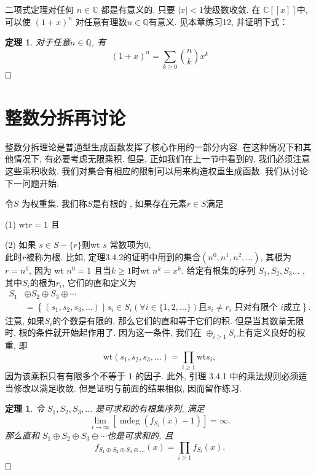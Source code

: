 \documentclass[a4paper,12pt]{ctexbook}
\newtheorem{theorem}[lemma]{\hspace{2em}定理}%
\begin{document}
二项式定理对任何  $n \in \mathbb{C}$ 都是有意义的, 只要 $|x|<1$使级数收敛. 在 $\mathbb{C}[[x]]$中, 可以使 $(1+x)^{n}$ 对任意有理数$n \in \mathbb{Q}$有意义. 见本章练习12, 并证明下式：
\begin{theorem}
	对于任意$n \in \mathbb{Q}$, 有$$
	(1+x)^{n}=\sum_{k \geq 0}\binom{n}{k}x^{k}
	$$
	$\hfill\square$
\end{theorem}
\section{整数分拆再讨论}
整数分拆理论是普通型生成函数发挥了核心作用的一部分内容. 在这种情况下和其他情况下, 有必要考虑无限乘积. 但是, 正如我们在上一节中看到的, 我们必须注意这些乘积收敛. 我们对集合有相应的限制可以用来构造权重生成函数. 我们从讨论下一问题开始.

令$S$ 为权重集. 我们称$S$是{\kaishu 有根的} , 如果存在元素$r \in S$满足

(1) $\mathrm{wt} r=1$ 且

(2) 如果 $s \in S-\{r\}$则wt $s$ 常数项为0, \\
此时$r$被称为{\kaishu 根}. 比如, 定理3.4.2的证明中用到的集合$\left(n^{0}, n^{1}, n^{2}, \ldots\right)$, 其根为$r=n^{0}$, 因为 wt $n^{0}=1$ 且当$k \geq 1$时wt $n^{k}=x^{k}$. 给定有根集的序列 $S_{1}, S_{2}, S_{3} \ldots$ , 其中$S_{i}$的根为$r_{i}$, 它们的{\kaishu 直和}定义为
$$
\begin{aligned}
S_{1} & \oplus S_{2} \oplus S_{3} \oplus \cdots \\
&=\left\{\left(s_{1}, s_{2}, s_{3}, \ldots\right) \mid s_{i} \in S_{i} (\forall i\in\{1,2,\dots\})\text {且} s_{i} \neq r_{i} \text { 只对有限个 } i\text{成立} \right\} .
\end{aligned}
$$
注意, 如果$S_{i}$的个数是有限的, 那么它们的直和等于它们的积. 但是当其数量无限时, 根的条件就开始起作用了. 因为这一条件, 我们在  $\oplus_{i \geq 1} S_{i}$上有定义良好的权重, 即
$$
\mathrm{wt}\left(s_{1}, s_{2}, s_{3}, \ldots\right)=\prod_{i \geq 1} \mathrm{wt} s_{i},
$$因为该乘积只有有限多个不等于 1 的因子. 此外, 引理 3.4.1 中的乘法规则必须适当修改以满足收敛. 但是证明与前面的结果相似, 因而留作练习.
\begin{theorem}
	令 $S_{1}, S_{2}, S_{3}, \ldots$ 是可求和的有根集序列, 满足$$
	\lim _{i \rightarrow \infty}\left[\operatorname{mdeg}\left(f_{S_{i}}(x)-1\right)\right]=\infty .
	$$那么直和 $S_{1} \oplus S_{2} \oplus S_{3} \oplus \cdots$也是可求和的, 且$$
	f_{S_{1} \oplus S_{2} \oplus S_{3} \oplus \ldots}(x)=\prod_{i \geq 1} f_{S_{l}}(x) .
	$$ $\hfill\square$
\end{theorem}
\end{document}
